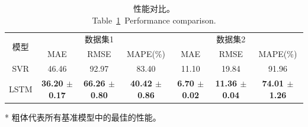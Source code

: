 \begin{table}[!htb]
	\centering
	\small %
	\caption{性能对比。\\Table~\ref{tab:ch2_res2}~Performance comparison. }
	\begin{threeparttable}
		\begin{tabular}{c|ccc|ccc}
			\toprule
			\multirow{2}{*}{模型} &  & 数据集1 &  &  & 数据集2&  \\
			& MAE & RMSE & MAPE(\%) & MAE & RMSE & MAPE(\%) \\
			\midrule
			
			SVR & 46.46 & 92.97 & 83.40 & 11.10 & 19.84 & 91.96  \\
			LSTM & \textbf{36.20 $\pm$0.17} & \textbf{66.26 $\pm$0.80} & \textbf{40.42 $\pm$0.86} & \textbf{6.70 $\pm$0.02} & \textbf{11.36 $\pm$0.04} & \textbf{74.01 $\pm$1.26}  \\
			\bottomrule
		\end{tabular}
		\begin{tablenotes}
			\footnotesize
			\item[*] 粗体代表所有基准模型中的最佳的性能。
		\end{tablenotes}
	\end{threeparttable}
	\label{tab:ch2_res2}
\end{table}



